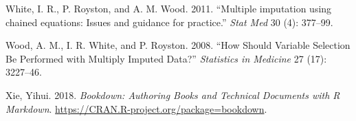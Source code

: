 \documentclass[
]{book}
\begin{document}
\leavevmode\hypertarget{ref-White2011}{}%
White, I. R., P. Royston, and A. M. Wood. 2011. ``Multiple imputation
using chained equations: Issues and guidance for practice.'' \emph{Stat
Med} 30 (4): 377--99.

\leavevmode\hypertarget{ref-Wood2008}{}%
Wood, A. M., I. R. White, and P. Royston. 2008. ``How Should Variable
Selection Be Performed with Multiply Imputed Data?'' \emph{Statistics in
Medicine} 27 (17): 3227--46.

\leavevmode\hypertarget{ref-R-bookdown}{}%
Xie, Yihui. 2018. \emph{Bookdown: Authoring Books and Technical
Documents with R Markdown}.
\url{https://CRAN.R-project.org/package=bookdown}.

\backmatter
\end{document}
